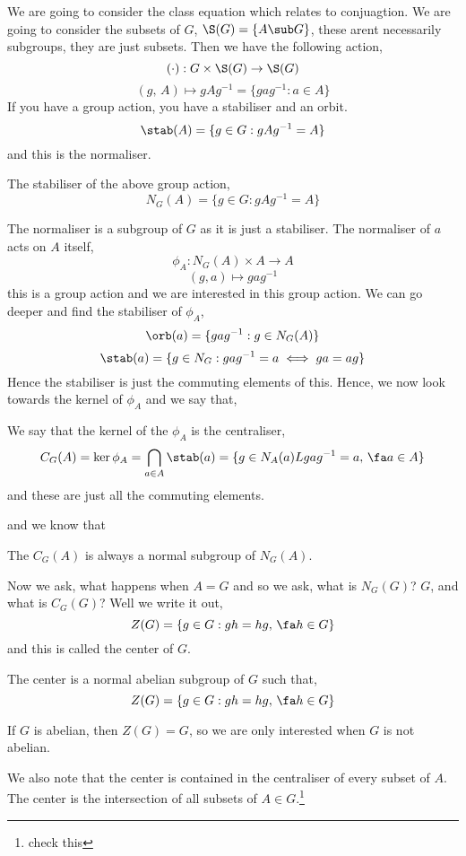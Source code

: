 We are going to consider the class equation which relates to conjuagtion. We are going to consider the subsets of $G$, $\S(G) = \{A \sub G\}$, these arent necessarily subgroups, they are just subsets. Then we have the following action,
$$ (\cdot) : G \times \S(G) \to \S(G)$$
$$ (g,\,A) \mapsto gAg^{-1} = \{gag^{-1} : a \in A\}$$
If you have a group action, you have a stabiliser and an orbit.
$$ \stab(A) = \{g \in G : gAg^{-1} = A\} $$
and this is the normaliser.
\begin{ndefi}[Normaliser]
  The stabiliser of the above group action,
  $$ N_G(A) = \{g \in G : gAg^{-1} = A\} $$
\end{ndefi}
The normaliser is a subgroup of $G$ as it is just a stabiliser. The normaliser of $a$ acts on $A$ itself,
$$ \phi_A : N_G(A) \times A \to A $$
$$ (g, a) \mapsto gag^{-1}$$
this is a group action and we are interested in this group action. We can go deeper and find the stabiliser of $\phi_A$,
$$ \orb(a) = \{gag^{-1} : g \in N_G(A)\} $$
$$ \stab(a) = \{g \in N_G : gag^{-1}=a \iff ga = ag\} $$
Hence the stabiliser is just the commuting elements of this. Hence, we now look towards the kernel of $\phi_A$ and we say that,
\begin{ndefi}[Centraliser]
  We say that the kernel of the $\phi_A$ is the centraliser,
  $$C_G(A) = \ker \phi_A = \bigcap_{a \in A}\stab(a) = \{g \in N_A(a) L gag^{-1} = a,\,\fa a \in A\} $$
  and these are just all the commuting elements.
\end{ndefi}
and we know that
\begin{nlemma}
  The $C_G(A)$ is always a normal subgroup of $N_G(A)$.
\end{nlemma}
Now we ask, what happens when $A = G$ and so we ask, what is $N_G(G)$? $G$, and what is $C_G(G)$? Well we write it out,
$$ Z(G) = \{g \in G : gh = hg,\, \fa h \in G\} $$
and this is called the center of $G$.
\begin{ndefi}[Center of $G$]
  The center is a normal abelian subgroup of $G$ such that,
  $$ Z(G) = \{g \in G : gh = hg,\, \fa h \in G\} $$
\end{ndefi}

\begin{eg}
  If $G$ is abelian, then $Z(G) = G$, so we are only interested when $G$ is not abelian.
\end{eg}

We also note that the center is contained in the centraliser of every subset of $A$. The center is the intersection of all subsets of $A \in G$.\footnote{check this}

